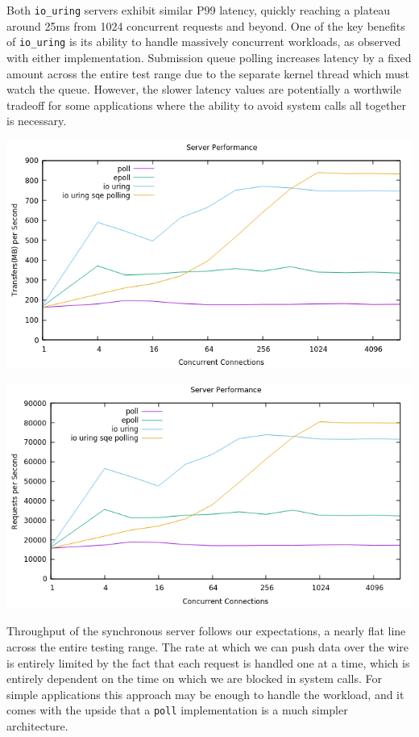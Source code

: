 \documentclass[letterpaper, 10pt, twocolumn]{article}
\begin{document}
Both \texttt{io\_uring} servers exhibit similar P99 latency, quickly reaching a plateau around 25ms from 1024 concurrent requests and beyond. One of the key benefits of \texttt{io\_uring} is its ability to handle massively concurrent workloads, as observed with either implementation. Submission queue polling increases latency by a fixed amount across the entire test range due to the separate kernel thread which must watch the queue. However, the slower latency values are potentially a worthwile tradeoff for some applications where the ability to avoid system calls all together is necessary.

\begin{center}
\includegraphics[width=.9\linewidth]{mbps.pn.png}
\end{center}
\begin{center}
\includegraphics[width=.9\linewidth]{rps.png}
\end{center}

Throughput of the synchronous server follows our expectations, a nearly flat line across the entire testing range. The rate at which we can push data over the wire is entirely limited by the fact that each request is handled one at a time, which is entirely dependent on the time on which we are blocked in system calls. For simple applications this approach may be enough to handle the workload, and it comes with the upside that a \texttt{poll} implementation is a much simpler architecture.
\end{document}
